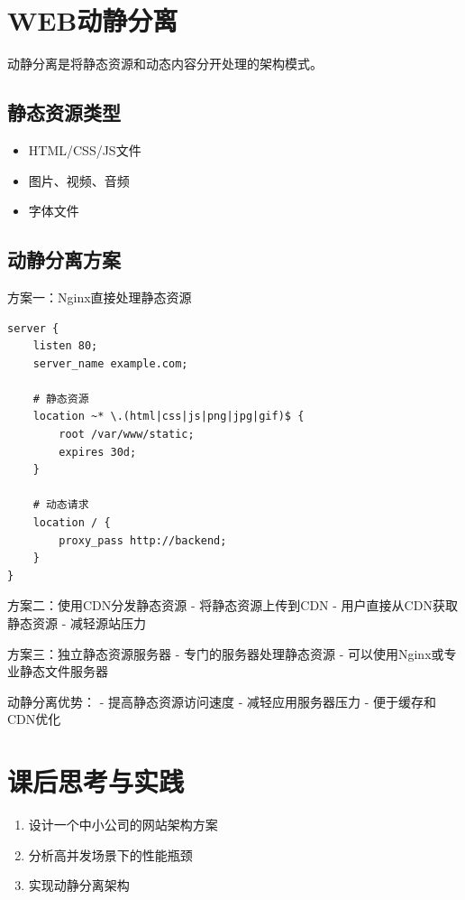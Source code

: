 \documentclass[12pt,UTF8]{ctexbook}
\begin{document}
\section{WEB动静分离}
\label{sec:static-dynamic-separate}

动静分离是将静态资源和动态内容分开处理的架构模式。

\subsection*{静态资源类型}
\begin{itemize}
    \item HTML/CSS/JS文件
    \item 图片、视频、音频
    \item 字体文件
\end{itemize}

\subsection*{动静分离方案}

方案一：Nginx直接处理静态资源
\begin{lstlisting}
server {
    listen 80;
    server_name example.com;
    
    # 静态资源
    location ~* \.(html|css|js|png|jpg|gif)$ {
        root /var/www/static;
        expires 30d;
    }
    
    # 动态请求
    location / {
        proxy_pass http://backend;
    }
}
\end{lstlisting}

方案二：使用CDN分发静态资源
- 将静态资源上传到CDN
- 用户直接从CDN获取静态资源
- 减轻源站压力

方案三：独立静态资源服务器
- 专门的服务器处理静态资源
- 可以使用Nginx或专业静态文件服务器

动静分离优势：
- 提高静态资源访问速度
- 减轻应用服务器压力
- 便于缓存和CDN优化

\section{课后思考与实践}
\label{sec:web-arch-practice}
\begin{enumerate}
    \item 设计一个中小公司的网站架构方案
    \item 分析高并发场景下的性能瓶颈
    \item 实现动静分离架构
\end{enumerate}
\end{document}
